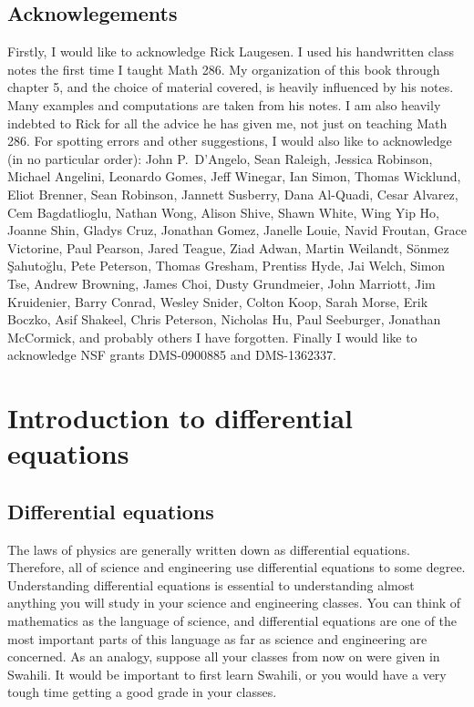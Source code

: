 

\subsection{Acknowlegements}

Firstly, I would like to acknowledge Rick Laugesen.  I used his handwritten
class notes
the first time I taught
Math 286.  My organization of this book through chapter 5,
and the choice of
material covered, is heavily influenced by his notes.  Many
examples and computations are taken from his notes.  I am also heavily
indebted to Rick for all the advice he has given me, not just on teaching
Math 286.
For spotting errors and other suggestions,
I would also like to acknowledge (in no particular order):
John P.\ D'Angelo,
Sean Raleigh, Jessica Robinson, Michael Angelini, Leonardo Gomes, Jeff
Winegar, Ian Simon, Thomas Wicklund, Eliot Brenner, Sean Robinson,
Jannett Susberry, Dana Al-Quadi, Cesar Alvarez, Cem Bagdatlioglu,
Nathan Wong, Alison Shive, Shawn White, Wing Yip Ho, Joanne Shin,
Gladys Cruz, Jonathan Gomez, Janelle Louie, Navid Froutan,
Grace Victorine, Paul Pearson, Jared Teague, Ziad Adwan,
Martin Weilandt, S\"{o}nmez \c{S}ahuto\u{g}lu,
Pete Peterson, Thomas Gresham, Prentiss Hyde, Jai Welch,
Simon Tse, Andrew Browning, James Choi, Dusty Grundmeier,
John Marriott,
Jim Kruidenier,
Barry Conrad,
Wesley Snider,
Colton Koop,
Sarah Morse,
Erik Boczko,
Asif Shakeel,
Chris Peterson,
Nicholas Hu,
Paul Seeburger,
Jonathan McCormick,
and probably others I
have forgotten.
Finally I would like
to acknowledge NSF grants DMS-0900885 and DMS-1362337.



\sectionnewpage
\section{Introduction to differential equations}
\label{introde:section}


\subsection{Differential equations}

The laws of physics are generally written down as differential
equations.  Therefore, all of science and engineering use
differential equations to some degree.  Understanding
differential equations is essential to understanding almost anything you will
study in your science and engineering classes.
You can think of mathematics as the language of science, and
differential equations are one of the most important parts of this
language as far as science and engineering are concerned.  As an analogy,
suppose all your classes from now on were given in Swahili.  
It would be important to first learn Swahili, or you would have a very
tough time getting a good grade in your classes.

